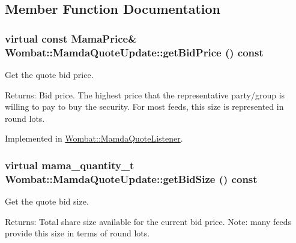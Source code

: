 \subsection{Member Function Documentation}
\hypertarget{classWombat_1_1MamdaQuoteUpdate_2abf6ec26cbedf5cddf77c8425353836}{
\subsubsection[getBidPrice]{\setlength{\rightskip}{0pt plus 5cm}virtual const Mama\-Price\& Wombat::Mamda\-Quote\-Update::get\-Bid\-Price () const}}
\label{classWombat_1_1MamdaQuoteUpdate_2abf6ec26cbedf5cddf77c8425353836}


Get the quote bid price. 

\begin{Desc}
\item[Returns:]Bid price. The highest price that the representative party/group is willing to pay to buy the security. For most feeds, this size is represented in round lots. \end{Desc}


Implemented in \hyperlink{classWombat_1_1MamdaQuoteListener_af4b7f010c56303476dc4de64fa0b3f4}{Wombat::Mamda\-Quote\-Listener}.\hypertarget{classWombat_1_1MamdaQuoteUpdate_1e19e5cf2c0c7dcbaac8de68ced4da44}{
\subsubsection[getBidSize]{\setlength{\rightskip}{0pt plus 5cm}virtual mama\_\-quantity\_\-t Wombat::Mamda\-Quote\-Update::get\-Bid\-Size () const}}
\label{classWombat_1_1MamdaQuoteUpdate_1e19e5cf2c0c7dcbaac8de68ced4da44}


Get the quote bid size. 

\begin{Desc}
\item[Returns:]Total share size available for the current bid price. Note: many feeds provide this size in terms of round lots. \end{Desc}


